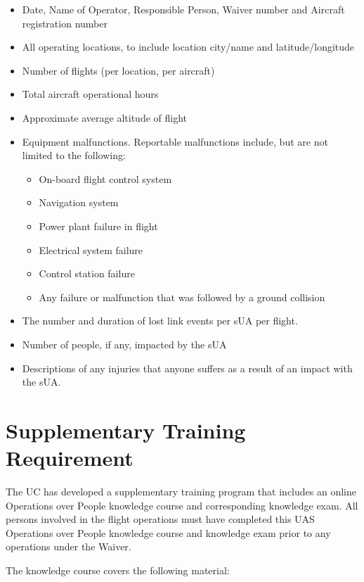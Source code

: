 \documentclass[
]{book}
\providecommand{\tightlist}{%
  \setlength{\itemsep}{0pt}\setlength{\parskip}{0pt}}
\begin{document}
\begin{itemize}
\item
  Date, Name of Operator, Responsible Person, Waiver number and Aircraft registration number
\item
  All operating locations, to include location city/name and latitude/longitude
\item
  Number of flights (per location, per aircraft)
\item
  Total aircraft operational hours
\item
  Approximate average altitude of flight
\item
  Equipment malfunctions. Reportable malfunctions include, but are not limited to the following:

  \begin{itemize}
  \tightlist
  \item
    On-board flight control system
  \item
    Navigation system
  \item
    Power plant failure in flight
  \item
    Electrical system failure
  \item
    Control station failure
  \item
    Any failure or malfunction that was followed by a ground collision
  \end{itemize}
\item
  The number and duration of lost link events per sUA per flight.
\item
  Number of people, if any, impacted by the sUA
\item
  Descriptions of any injuries that anyone suffers as a result of an impact with the sUA.
\end{itemize}

\section{Supplementary Training Requirement}\label{s39v-tr}

The UC has developed a supplementary training program that includes an online Operations over People knowledge course and corresponding knowledge exam. All persons involved in the flight operations must have completed this UAS Operations over People knowledge course and knowledge exam prior to any operations under the Waiver.

The knowledge course covers the following material:
\end{document}
